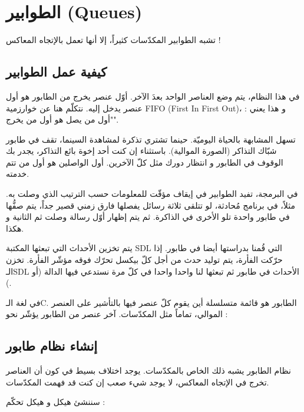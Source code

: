 \section{الطوابير (\textenglish{Queues})}

تشبه الطوابير المكدّسات كثيراً، إلا أنها تعمل بالإتجاه المعاكس !

\subsection{كيفية عمل الطوابير}

في هذا النظام، يتم وضع العناصر الواحد بعدَ الآخر. أوّل عنصر يخرج من الطابور هو أول عنصر يدخل إليه. نتكلّم هنا عن خوارزمية 
\textenglish{FIFO} (\textenglish{First In First Out})،
و هذا يعني : "أول من يصل هو أول من يخرج".

تسهل المشابهة بالحياة اليوميّة. حينما تشتري تذكرة لمشاهدة السينما، تقف في طابور شبّاك التذاكر (الصورة الموالية). باستثناء إن كنت أحد إخوة بائع التذاكر، يجدر بك الوقوف في الطابور و انتظار دورك مثل كلّ الآخرين. أول الواصلين هو أول من تتم خدمته.


 في البرمجة، تفيد الطوابير في إيقاف مؤقّت للمعلومات حسب الترتيب الذي وصلت به. مثلاً، في برنامج مُحادثة، لو تتلقى ثلاثة رسائل يفصلها فارق زمني قصير جداً، يتم صفُّها في طابور واحدة تلو الأخرى في الذاكرة. ثم يتم إظهار أوّل رسالة وصلت ثم الثانية و هكذا.
 
يتم تخزين الأحداث التي تبعثها المكتبة
\textenglish{SDL}
التي قُمنا بدراستها أيضا في طابور. إذا حرّكت الفأرة، يتم توليد حدث من أجل كلّ بيكسل تحرّك فوقه مؤشّر الفأرة. تخزن الـ\textenglish{SDL}
الأحداث في طابور ثم تبعثها لنا واحدا واحدا في كلّ مرة نستدعي فيها الدالة
(أو
).

في لغة الـ\textenglish{C}.
الطابور هو قائمة متسلسلة أين يقوم كلّ عنصر فيها بالتأشير على العنصر الموالي، تماماً مثل المكدّسات. آخر عنصر من الطابور يؤشّر نحو
 :


\subsection{إنشاء نظام طابور}

نظام الطابور يشبه ذلك الخاص بالمكدّسات. يوجد اختلاف بسيط في كون أن العناصر تخرج في الإتجاه المعاكس، لا يوجد شيء صعب إن كنت قد فهمت المكدّسات.

سننشئ هيكل
و هيكل تحكّم
 :

